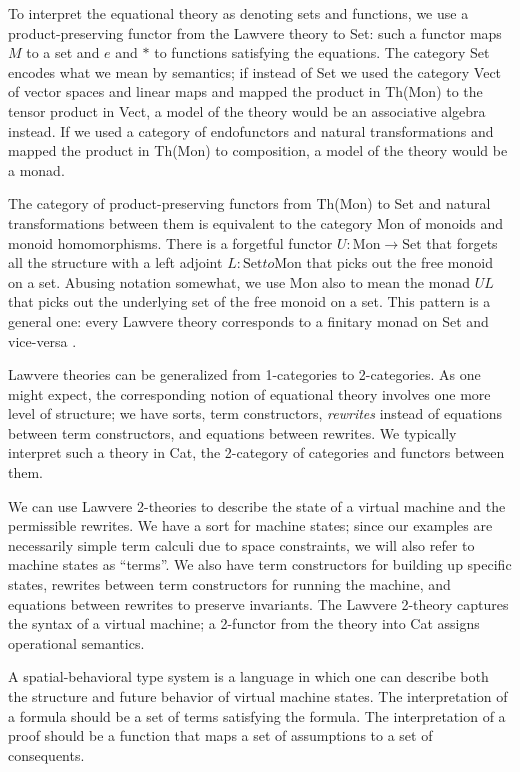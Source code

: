 \documentclass{article}
\newcommand{\maps}{\colon}
\newcommand{\Set}{\mathrm{Set}}
\newcommand{\Mon}{\mathrm{Mon}}
\begin{document}
  To interpret the equational theory as denoting sets and functions, we use a product-preserving functor from the Lawvere theory to Set: such a functor maps $M$ to a set and $e$ and $*$ to functions satisfying the equations.  The category Set encodes what we mean by semantics; if instead of Set we used the category Vect of vector spaces and linear maps and mapped the product in Th(Mon) to the tensor product in Vect, a model of the theory would be an associative algebra instead.  If we used a category of endofunctors and natural transformations and mapped the product in Th(Mon) to composition, a model of the theory would be a monad.

  The category of product-preserving functors from Th(Mon) to Set and natural transformations between them is equivalent to the category Mon of monoids and monoid homomorphisms.  There is a forgetful functor $U\maps \Mon \to \Set$ that forgets all the structure with a left adjoint $L\maps \Set to \Mon$ that picks out the free monoid on a set.  Abusing notation somewhat, we use Mon also to mean the monad $UL$ that picks out the underlying set of the free monoid on a set.  This pattern is a general one: every Lawvere theory corresponds to a finitary monad on Set and vice-versa \cite{HylandPower}.

  Lawvere theories can be generalized from 1-categories to 2-categories.  As one might expect, the corresponding notion of equational theory involves one more level of structure; we have sorts, term constructors, {\em rewrites} instead of equations between term constructors, and equations between rewrites.  We typically interpret such a theory in Cat, the 2-category of categories and functors between them.

  We can use Lawvere 2-theories to describe the state of a virtual machine and the permissible rewrites.  We have a sort for machine states; since our examples are necessarily simple term calculi due to space constraints, we will also refer to machine states as ``terms''.  We also have term constructors for building up specific states, rewrites between term constructors for running the machine, and equations between rewrites to preserve invariants.  The Lawvere 2-theory captures the syntax of a virtual machine; a 2-functor from the theory into Cat assigns operational semantics.

  A spatial-behavioral type system is a language in which one can describe both the structure and future behavior of virtual machine states.  The interpretation of a formula should be a set of terms satisfying the formula.  The interpretation of a proof should be a function that maps a set of assumptions to a set of consequents.
\end{document}

